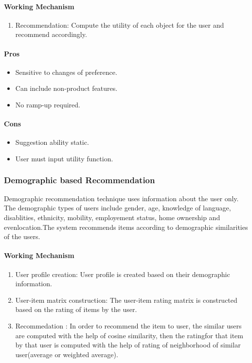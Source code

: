 \paragraph{Working Mechanism}\hfill
\begin{enumerate}
	\item Recommendation: Compute the utility of each object for the user and recommend accordingly. 
\end{enumerate}
\paragraph{Pros}\hfill

\begin{itemize}
	\item Sensitive to changes of preference.
	\item Can include non-product features.
	\item No ramp-up required.
\end{itemize}
\paragraph{Cons}\hfill

\begin{itemize}
	\item Suggestion ability static.
	\item User must input utility function.
\end{itemize}

\subsubsection{Demographic based Recommendation}
Demographic recommendation technique \cite{demographic} uses information about the user only. The demographic types of users include gender, age, knowledge of language, disablities, ethnicity, mobility, employement status, home  ownership and evenlocation.The system recommends items according to demographic similarities of the users.
\paragraph{Working Mechanism}\hfill
\begin{enumerate}
	\item User profile creation: User profile is created based on their demographic information.
	\item User-item matrix construction: The user-item rating matrix is constructed based on the rating of items by the user.
	\item Recommedation : In order to recommend the item to user, the similar users are computed with the help of cosine similarity, then the ratingfor that item by that user is computed with the help of rating of neighborhood of similar user(average or weighted average).
\end{enumerate}
